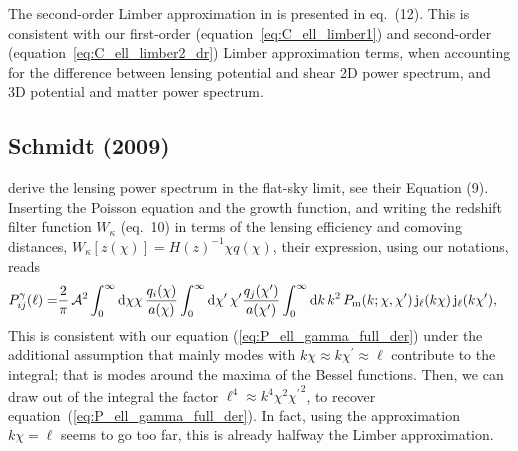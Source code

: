 \documentclass[fleqn,usenatbib]{mnras} %
\newcommand{\pref}{{\cal A}}
\begin{document}
\begin{appendix}
The second-order Limber approximation in \cite{2008PhRvD..78l3506L} is
presented in eq.~(12). This is consistent with our first-order
(equation~\ref{eq:C_ell_limber1}) and second-order
(equation~\ref{eq:C_ell_limber2_dr}) Limber approximation terms, when
accounting for the difference between lensing potential and shear 2D power
spectrum, and 3D potential and matter power spectrum.


\subsection{Schmidt (2009)}
\label{sec:schmidt08}

\cite{2008PhRvD..78d3002S} derive the lensing power spectrum in the flat-sky
limit, see their Equation (9). Inserting the Poisson equation and the
growth function, and writing the redshift filter function
$W_\kappa$ (eq.~10) in terms of the lensing efficiency and comoving distances,
$W_\kappa[z(\chi)] = H(z)^{-1} \chi q(\chi)$, their expression, using our
notations, reads
%
\begin{align}
  P_{ij}^\gamma(\ell) = & \frac 2 \pi \, \pref^2
                 \int_{0}^\infty {\rm d} \chi \chi \, \frac{q_i(\chi)}{a(\chi)}
                \int_{0}^\infty {\rm d} \chi^\prime\, \chi^\prime
                \frac{q_j(\chi^\prime)}{a(\chi^\prime)}
                \int_0^\infty {\rm d} k \, k^2 \, P_{\rm m}(k; \chi, \chi^\prime) \,
                {\rm j}_\ell(k \chi) \, {\rm j}_\ell(k \chi^\prime) ,
  \label{eq:P_ell_gamma}
\end{align}
%
This is consistent with our equation (\ref{eq:P_ell_gamma_full_der}) under the
additional assumption that mainly modes with $k \chi \approx k \chi^\prime
\approx \ell$ contribute to the integral; that is modes around the maxima of
the Bessel functions. Then, we can draw out of the integral the factor $\ell^4
\approx k^4 \chi^2 {\chi^\prime}^2$, to recover
equation~(\ref{eq:P_ell_gamma_full_der}).
In fact, using the approximation $k \chi = \ell$ seems to go too far, this is
already halfway the Limber approximation.



\end{appendix}
\end{document}
